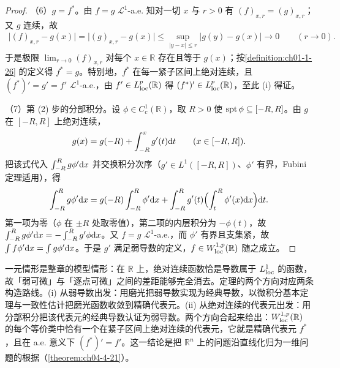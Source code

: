 ﻿\documentclass[../../main.tex]{subfiles}%
\begin{document}
\begin{proof}
（6）$g=f^{*}$。由 $f=g$ $\mathcal{L}^{1}$-a.e. 知对一切 $x$ 与 $r>0$ 有 $(f)_{x,r}=(g)_{x,r}$；又 $g$ 连续，故
\begin{align*}
\lvert(f)_{x,r}-g(x)\rvert=\lvert(g)_{x,r}-g(x)\rvert\leqslant\sup_{\lvert y-x\rvert\leqslant r}\lvert g(y)-g(x)\rvert\to0\qquad(r\to0).
\end{align*}
于是极限 $\lim_{r\to0}(f)_{x,r}$ 对每个 $x\in\mathbb{R}$ 存在且等于 $g(x)$；按\cref{definition:ch01-1-26} 的定义得 $f^{*}=g$。特别地，$f^{*}$ 在每一紧子区间上绝对连续，且 $(f^{*})'=g'=f'$ $\mathcal{L}^{1}$-a.e.，由 $f'\in L^{p}_{\mathrm{loc}}(\mathbb{R})$ 得 $(f^{*})'\in L^{p}_{\mathrm{loc}}(\mathbb{R})$，至此 (i) 得证。%

（7）第 (2) 步的分部积分。设 $\phi\in C^{1}_{c}(\mathbb{R})$，取 $R>0$ 使 $\operatorname{spt}\phi\subseteq[-R,R]$。由 $g$ 在 $[-R,R]$ 上绝对连续，
\begin{align*}
g(x)=g(-R)+\int_{-R}^{x}g'(t)\mathrm{d} t\qquad(x\in[-R,R]).
\end{align*}
把该式代入 $\int_{-R}^{R}g\phi'\mathrm{d} x$ 并交换积分次序（$g'\in L^{1}([-R,R])$、$\phi'$ 有界，Fubini 定理适用），得
\begin{align*}
\int_{-R}^{R}g\phi'\mathrm{d} x=g(-R)\int_{-R}^{R}\phi'\mathrm{d} x+\int_{-R}^{R}g'(t)\Bigl(\int_{t}^{R}\phi'(x)\mathrm{d} x\Bigr)\mathrm{d} t .
\end{align*}
第一项为零（$\phi$ 在 $\pm R$ 处取零值），第二项的内层积分为 $-\phi(t)$，故 $\int_{-R}^{R}g\phi'\mathrm{d} x=-\int_{-R}^{R}g'\phi\mathrm{d} x$。又 $f=g$ $\mathcal{L}^{1}$-a.e.，而 $\phi'$ 有界且支集紧，故 $\int f\phi'\mathrm{d} x=\int g\phi'\mathrm{d} x$。于是 $g'$ 满足弱导数的定义，$f\in W^{1,p}_{\mathrm{loc}}(\mathbb{R})$ 随之成立。
\end{proof}

\begin{remark}\label{remark:ch04-thm-4-20-动机}
一元情形是整章的模型情形：在 $\mathbb{R}$ 上，绝对连续函数恰是导数属于 $L^{1}_{\mathrm{loc}}$ 的函数，故「弱可微」与「逐点可微」之间的差距能够完全消去。定理的两个方向对应两条构造路线。(i) 从弱导数出发：用磨光把弱导数实现为经典导数，以微积分基本定理与一致性估计把磨光函数收敛到精确代表元。(ii) 从绝对连续的代表元出发：用分部积分把该代表元的经典导数认证为弱导数。两个方向合起来给出：$W^{1,p}_{\mathrm{loc}}(\mathbb{R})$ 的每个等价类中恰有一个在紧子区间上绝对连续的代表元，它就是精确代表元 $f^{*}$，且在 a.e. 意义下 $(f^{*})'=f'$。这一结论是把 $\mathbb{R}^{n}$ 上的问题沿直线化归为一维问题的根据（\cref{theorem:ch04-4-21}）。%
\end{remark}
\end{document}
